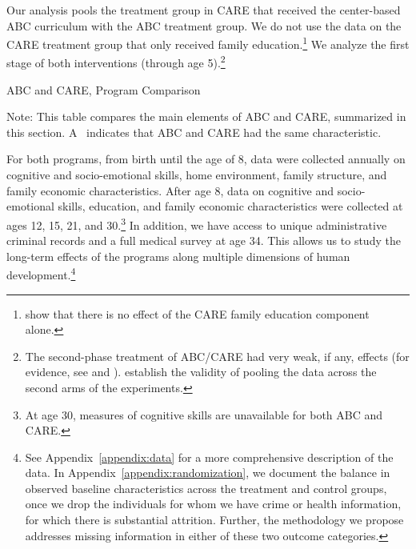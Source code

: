 Our analysis pools the treatment group in CARE that received the center-based ABC curriculum with the ABC treatment group. We do not use the data on the CARE treatment group that only received family education.\footnote{\citet{ABCCARE_Dataset} show that there is no effect of the CARE family education component alone.} We analyze the first stage of both interventions (through age 5).\footnote{The second-phase treatment of ABC/CARE had very weak, if any, effects (for evidence, see \citealp{Campbell_Conti_etal_2014_EarlyChildhoodInvestments} and \citealp{ABCCARE_Dataset}). \citet{Campbell_Conti_etal_2014_EarlyChildhoodInvestments} establish the validity of pooling the data across the second arms of the experiments.}

\begin{table}[!htbp]
\centering
\caption{ABC and CARE, Program Comparison} \label{tab:programcomparison}
\begin{adjustbox}{max width=\textwidth}
\begin{threeparttable}
	\footnotesize
	
\begin{tablenotes}
\footnotesize
\item Note: This table compares the main elements of ABC and CARE, summarized in this section. A \checkmark\ indicates that ABC and CARE had the same characteristic.
\end{tablenotes}
\end{threeparttable}
\end{adjustbox}
\end{table}

For both programs, from birth until the age of 8, data were collected annually on cognitive and socio-emotional skills, home environment, family structure, and family economic characteristics. After age 8, data on cognitive and socio-emotional skills, education, and family economic characteristics were collected at ages 12, 15, 21, and 30.\footnote{At age 30, measures of cognitive skills are unavailable for both ABC and CARE.} In addition, we have access to unique administrative criminal records and a full medical survey at age 34. This allows us to study the long-term effects of the programs along multiple dimensions of human development.\footnote{See Appendix~\ref{appendix:data} for a more comprehensive description of the data. In Appendix~\ref{appendix:randomization}, we document the balance in observed baseline characteristics across the treatment and control groups, once we drop the individuals for whom we have crime or health information, for which there is substantial attrition. Further, the methodology we propose addresses missing information in either of these two outcome categories.}

